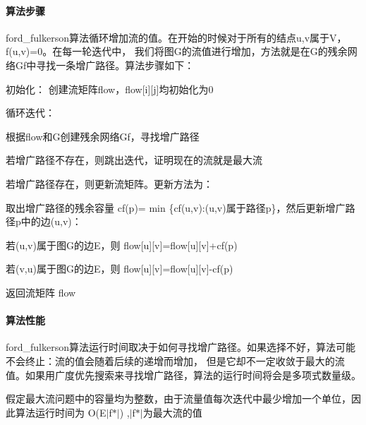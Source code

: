 \paragraph*{算法步骤}

ford\+\_\+fulkerson算法循环增加流的值。在开始的时候对于所有的结点u,v属于\+V，f(u,v)=0。在每一轮迭代中， 我们将图\+G的流值进行增加，方法就是在\+G的残余网络\+Gf中寻找一条增广路径。算法步骤如下：


\begin{DoxyItemize}
\item 初始化： 创建流矩阵flow，flow\mbox{[}i\mbox{]}\mbox{[}j\mbox{]}均初始化为0
\item 循环迭代：
\begin{DoxyItemize}
\item 根据flow和\+G创建残余网络\+Gf，寻找增广路径
\item 若增广路径不存在，则跳出迭代，证明现在的流就是最大流
\item 若增广路径存在，则更新流矩阵。更新方法为：
\begin{DoxyItemize}
\item 取出增广路径的残余容量 cf(p)= min \{cf(u,v)\+:(u,v)属于路径p\}，然后更新增广路径p中的边(u,v)：
\begin{DoxyItemize}
\item 若(u,v)属于图\+G的边\+E，则 flow\mbox{[}u\mbox{]}\mbox{[}v\mbox{]}=flow\mbox{[}u\mbox{]}\mbox{[}v\mbox{]}+cf(p)
\item 若(v,u)属于图\+G的边\+E，则 flow\mbox{[}u\mbox{]}\mbox{[}v\mbox{]}=flow\mbox{[}u\mbox{]}\mbox{[}v\mbox{]}-\/cf(p)
\end{DoxyItemize}
\end{DoxyItemize}
\end{DoxyItemize}
\item 返回流矩阵 flow
\end{DoxyItemize}

\paragraph*{算法性能}

ford\+\_\+fulkerson算法运行时间取决于如何寻找增广路径。如果选择不好，算法可能不会终止：流的值会随着后续的递增而增加， 但是它却不一定收敛于最大的流值。如果用广度优先搜索来寻找增广路径，算法的运行时间将会是多项式数量级。

假定最大流问题中的容量均为整数，由于流量值每次迭代中最少增加一个单位，因此算法运行时间为 O(E$\vert$f$\ast$$\vert$) ,$\vert$f$\ast$$\vert$为最大流的值 

